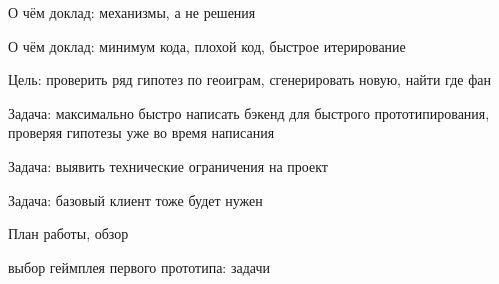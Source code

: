 \documentclass[aspectratio=169,handout,bigger]{beamer}
\begin{document}

\begin{frame}{О чём доклад: механизмы, а не решения}
\end{frame}


\begin{frame}{О чём доклад: минимум кода, плохой код, быстрое итерирование}
\end{frame}


\begin{frame}{Цель: проверить ряд гипотез по геоиграм, сгенерировать новую, найти где фан}
\end{frame}


\begin{frame}{Задача: максимально быстро написать бэкенд для быстрого прототипирования, проверяя гипотезы уже во время написания}
\end{frame}


\begin{frame}{Задача: выявить технические ограничения на проект}
\end{frame}


\begin{frame}{Задача: базовый клиент тоже будет нужен}
\end{frame}


\begin{frame}{План работы, обзор}
\end{frame}


\begin{frame}{выбор геймплея первого прототипа: задачи}
\end{frame}
\end{document}
